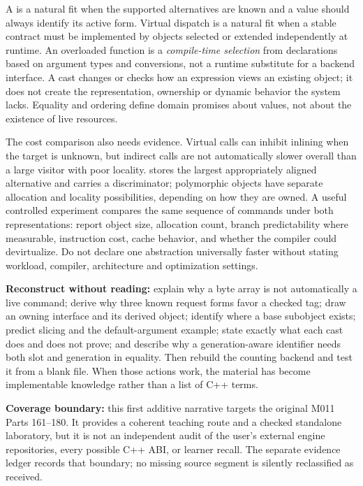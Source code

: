 A  is a natural fit when the supported alternatives are known and a value should always identify its active form. Virtual dispatch is a natural fit when a stable contract must be implemented by objects selected or extended independently at runtime. An overloaded function is a \emph{compile-time selection} from declarations based on argument types and conversions, not a runtime substitute for a backend interface. A cast changes or checks how an expression views an existing object; it does not create the representation, ownership or dynamic behavior the system lacks. Equality and ordering define domain promises about values, not about the existence of live resources.

The cost comparison also needs evidence. Virtual calls can inhibit inlining when the target is unknown, but indirect calls are not automatically slower overall than a large  visitor with poor locality.  stores the largest appropriately aligned alternative and carries a discriminator; polymorphic objects have separate allocation and locality possibilities, depending on how they are owned. A useful controlled experiment compares the same sequence of commands under both representations: report object size, allocation count, branch predictability where measurable, instruction cost, cache behavior, and whether the compiler could devirtualize. Do not declare one abstraction universally faster without stating workload, compiler, architecture and optimization settings.

\textbf{Reconstruct without reading:} explain why a byte array is not automatically a live command; derive why three known request forms favor a checked tag; draw an owning interface and its derived object; identify where a base subobject exists; predict slicing and the default-argument example; state exactly what each cast does and does not prove; and describe why a generation-aware identifier needs both slot and generation in equality. Then rebuild the counting backend and test it from a blank file. When those actions work, the material has become implementable knowledge rather than a list of C++ terms.

\textbf{Coverage boundary:} this first additive narrative targets the original M011 Parts 161--180. It provides a coherent teaching route and a checked standalone laboratory, but it is not an independent audit of the user's external engine repositories, every possible C++ ABI, or learner recall. The separate evidence ledger records that boundary; no missing source segment is silently reclassified as received.

